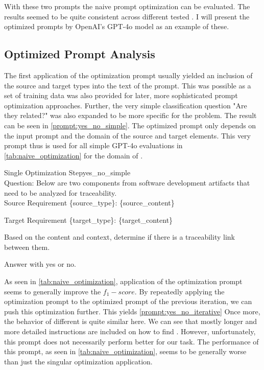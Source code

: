 With these two prompts the naive prompt optimization can be evaluated. The results seemed to be quite consistent across different tested \LLMs. I will present the optimized prompts by OpenAI's GPT-4o model as an example of these.

\subsection{Optimized Prompt Analysis}
The first application of the optimization prompt usually yielded an inclusion of the source and target types into the text of the prompt. This was possible as a set of training data was also provided for later, more sophisticated prompt optimization approaches. Further, the very simple classification question "Are they related?" was also expanded to be more specific for the \TLR problem.  The result can be seen in \autoref{prompt:yes_no_simple}.
The optimized prompt only depends on the input prompt and the domain of the source and target elements. This very prompt thus is used for all simple GPT-4o evaluations in \autoref{tab:naive_optimization} for the domain of \RtR. 

\begin{prompt}{\KISS Single Optimization Step}{yes_no_simple}\\
    Question: Below are two components from software development artifacts that need to be analyzed for traceability.\\

            Source Requirement \{source\_type\}: \tripplequote\{source\_content\}\tripplequote

            Target Requirement \{target\_type\}: \tripplequote\{target\_content\}\tripplequote
            
            Based on the content and context, determine if there is a traceability link between them.

            Answer with \textquotesingle{}yes\textquotesingle{} or \textquotesingle{}no\textquotesingle{}.
    
\end{prompt}

As seen in \autoref{tab:naive_optimization}, application of the optimization prompt seems to generally improve the $f_1-score$. 
By repeatedly applying the optimization prompt to the optimized prompt of the previous iteration, we can push this optimization further.
This yields \autoref{prompt:yes_no_iterative}
Once more, the behavior of different \LLMs is quite similar here.
We can see that mostly longer and more detailed instructions are included on how to find \TLs. 
However, unfortunately, this prompt does not necessarily perform better for our task. 
The performance of this prompt, as seen in \autoref{tab:naive_optimization}, seems to be generally worse than just the singular optimization application.

